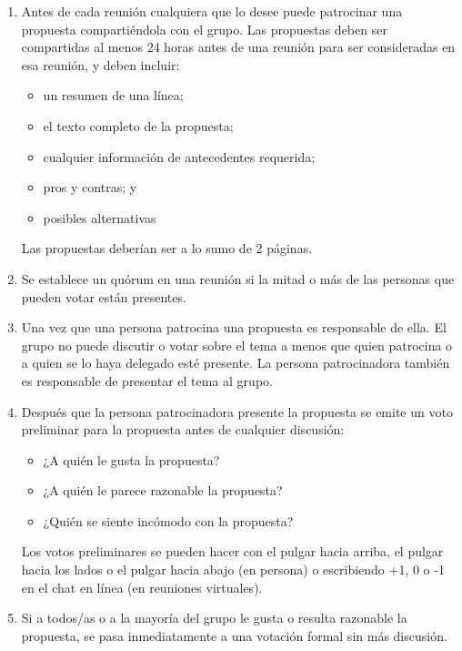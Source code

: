 \begin{enumerate}

\item
  Antes de cada reunión
  cualquiera que lo desee puede patrocinar una propuesta compartiéndola con el grupo.
  Las propuestas deben ser compartidas al menos 24 horas antes de una reunión para ser consideradas en esa reunión,
  y deben incluir:
  \begin{itemize}
  \item un resumen de una línea;
  \item el texto completo de la propuesta;
  \item cualquier información de antecedentes requerida;
  \item pros y contras; y
  \item posibles alternativas
  \end{itemize}
  Las propuestas deberían ser a lo sumo de 2 páginas.

\item
  Se establece un quórum en una reunión si la mitad o más de las personas
  que pueden votar están presentes.

\item
  Una vez que una persona patrocina una propuesta
  es responsable de ella.
  El grupo no puede discutir o votar sobre el tema a menos que quien patrocina o 
  a quien se lo haya delegado esté presente.
  La persona patrocinadora también es responsable de presentar el tema al grupo.

\item
  Después que la persona patrocinadora presente la propuesta
  se emite un voto preliminar para la propuesta antes de cualquier discusión:
  \begin{itemize}
  \item ¿A quién le gusta la propuesta?
  \item ¿A quién le parece razonable la propuesta?
  \item ¿Quién se siente incómodo con la propuesta?
  \end{itemize}
  Los votos preliminares se pueden hacer con el pulgar hacia arriba, 
  el pulgar hacia los lados o el pulgar hacia abajo (en persona)
  o escribiendo +1, 0 o -1 en el chat en línea (en reuniones virtuales).

\item
  Si a todos/as o a la mayoría del grupo le gusta o resulta razonable la propuesta,
  se pasa inmediatamente a una votación formal sin más discusión.


\end{enumerate}
